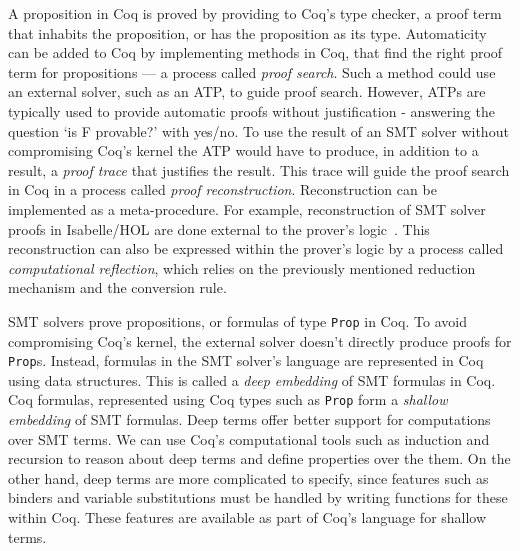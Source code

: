 \documentclass{article}
\begin{document}
	A proposition in Coq is proved by 
	providing to Coq's type checker, a 
	proof term that inhabits the 
	proposition, or has the proposition 
	as its type. Automaticity can be 
	added to Coq by implementing 
	methods in Coq, that find the right 
	proof term for propositions --- a 
	process called \textit{proof search}. 
	Such a method could use an external 
	solver, such as an ATP, to guide 
	proof search. However, ATPs are 
	typically used to provide automatic 
	proofs without justification - 
	answering the question `is F 
	provable?' with	yes/no. To use the 
	result of an SMT solver without 
	compromising Coq's kernel the ATP 
	would have to produce, in addition 
	to a result, a \textit{proof trace} 
	that justifies the result. This 
	trace will guide the proof search 
	in Coq in a process called 
	\textit{proof reconstruction}. 
	Reconstruction can be implemented 
	as a meta-procedure. For example, 
	reconstruction of SMT solver proofs 
	in Isabelle/HOL are done external to 
	the prover's logic~\cite{bohme}. 
	This reconstruction can also be 
	expressed within the prover's logic 
	by a process called 
	\textit{computational reflection}, 
	which relies on the previously 
	mentioned reduction mechanism and 
	the conversion rule.

	SMT solvers prove propositions, or 
	formulas of type \texttt{Prop} in 
	Coq. To avoid compromising Coq's 
	kernel, the external solver doesn't 
	directly produce proofs for 
	\texttt{Prop}s.	Instead, formulas 
	in the SMT solver's	language are 
	represented in Coq using data 
	structures. This is called a 
	\textit{deep embedding} of SMT 
	formulas in Coq. Coq formulas, 
	represented using Coq types such 
	as \texttt{Prop} form a 
	\textit{shallow embedding} of 
	SMT formulas. Deep terms offer 
	better support for computations 
	over SMT terms. We can use Coq's 
	computational tools such as 
	induction and recursion to reason 
	about deep terms and 
	define properties over the them. 
	On the other hand, deep terms 
	are more complicated to specify, 
	since features such as binders 
	and variable substitutions must 
	be handled by writing functions 
	for these within Coq. These 
	features are available as part 
	of Coq's language for shallow 
	terms. 
	
\end{document}
